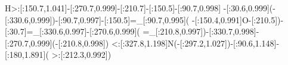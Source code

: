 H>:[:150.7,1.041]-[:270.7,0.999]-[:210.7]-[:150.5]-[:90.7,0.998]%
-[:30.6,0.999](-[:330.6,0.999])-[:90.7,0.997]-[:150.5]=_[:90.7,0.995](%
-[:150.4,0.991]O-[:210.5])-[:30.7]=_[:330.6,0.997]-[:270.6,0.999](%
=_[:210.8,0.997])-[:330.7,0.998]-[:270.7,0.999](-[:210.8,0.998])%
<:[:327.8,1.198]N(-[:297.2,1.027])-[:90.6,1.148]-[:180,1.891](%
>:[:212.3,0.992])